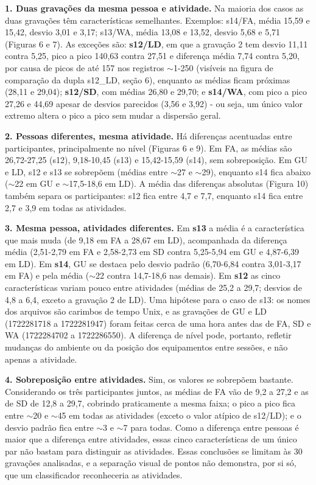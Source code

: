 \textbf{1. Duas gravações da mesma pessoa e atividade.} Na maioria dos casos as duas gravações têm características semelhantes. Exemplos: s14/FA, média 15,59 e 15,42, desvio 3,01 e 3,17; s13/WA, média 13,08 e 13,52, desvio 5,68 e 5,71 (Figuras 6 e 7). As exceções são: \textbf{s12/LD}, em que a gravação 2 tem desvio 11,11 contra 5,25, pico a pico 140,63 contra 27,51 e diferença média 7,74 contra 5,20, por causa de picos de até 157 nos registros $\sim$1-250 (visíveis na figura de comparação da dupla s12\_LD, seção 6), enquanto as médias ficam próximas (28,11 e 29,04); \textbf{s12/SD}, com médias 26,80 e 29,70; e \textbf{s14/WA}, com pico a pico 27,26 e 44,69 apesar de desvios parecidos (3,56 e 3,92) - ou seja, um único valor extremo altera o pico a pico sem mudar a dispersão geral.

\textbf{2. Pessoas diferentes, mesma atividade.} Há diferenças acentuadas entre participantes, principalmente no nível (Figuras 6 e 9). Em FA, as médias são 26,72-27,25 (s12), 9,18-10,45 (s13) e 15,42-15,59 (s14), sem sobreposição. Em GU e LD, s12 e s13 se sobrepõem (médias entre $\sim$27 e $\sim$29), enquanto s14 fica abaixo ($\sim$22 em GU e $\sim$17,5-18,6 em LD). A média das diferenças absolutas (Figura 10) também separa os participantes: s12 fica entre 4,7 e 7,7, enquanto s14 fica entre 2,7 e 3,9 em todas as atividades.

\textbf{3. Mesma pessoa, atividades diferentes.} Em \textbf{s13} a média é a característica que mais muda (de 9,18 em FA a 28,67 em LD), acompanhada da diferença média (2,51-2,79 em FA e 2,58-2,73 em SD contra 5,25-5,94 em GU e 4,87-6,39 em LD). Em \textbf{s14}, GU se destaca pelo desvio padrão (6,70-6,84 contra 3,01-3,17 em FA) e pela média ($\sim$22 contra 14,7-18,6 nas demais). Em \textbf{s12} as cinco características variam pouco entre atividades (médias de 25,2 a 29,7; desvios de 4,8 a 6,4, exceto a gravação 2 de LD). Uma hipótese para o caso de s13: os nomes dos arquivos são carimbos de tempo Unix, e as gravações de GU e LD (1722281718 a 1722281947) foram feitas cerca de uma hora antes das de FA, SD e WA (1722284702 a 1722286550). A diferença de nível pode, portanto, refletir mudanças do ambiente ou da posição dos equipamentos entre sessões, e não apenas a atividade.

\textbf{4. Sobreposição entre atividades.} Sim, os valores se sobrepõem bastante. Considerando os três participantes juntos, as médias de FA vão de 9,2 a 27,2 e as de SD de 12,8 a 29,7, cobrindo praticamente a mesma faixa; o pico a pico fica entre $\sim$20 e $\sim$45 em todas as atividades (exceto o valor atípico de s12/LD); e o desvio padrão fica entre $\sim$3 e $\sim$7 para todas. Como a diferença entre pessoas é maior que a diferença entre atividades, essas cinco características de um único par não bastam para distinguir as atividades. Essas conclusões se limitam às 30 gravações analisadas, e a separação visual de pontos não demonstra, por si só, que um classificador reconheceria as atividades.

\newpage
